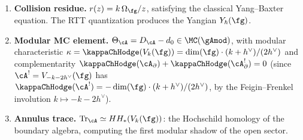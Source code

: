 \begin{theorem}
\begin{enumerate}[label=\textup{(\roman*)},nosep]
\item \textbf{Collision residue.}
 $r(z) = k\,\Omega_\fg / z$, satisfying the classical Yang--Baxter
 equation. The RTT quantization produces the Yangian $Y_\hbar(\fg)$.

\item \textbf{Modular MC element.}
 $\Theta_\cA = D_\cA - d_0 \in \MC(\gAmod)$, with modular
 characteristic $\kappa = \kappaChHodge(V_k(\fg))
 = \dim(\fg)\cdot(k + h^\vee)/(2h^\vee)$ and complementarity
 $\kappaChHodge(\cA_\partial) + \kappaChHodge(\cA_\partial^!) = 0$
 \textup{(}since $\cA^! = V_{-k-2h^\vee}(\fg)$ has
 $\kappaChHodge(\cA^!) = -\dim(\fg)\cdot(k+h^\vee)/(2h^\vee)$, by the
 Feigin--Frenkel involution $k \mapsto -k-2h^\vee$\textup{)}.

\item \textbf{Annulus trace.}
 $\operatorname{Tr}_\cA \simeq HH_*(V_k(\fg))$: the
 Hochschild homology of the boundary algebra, computing the
 first modular shadow of the open sector.
\end{enumerate}
\end{theorem}

